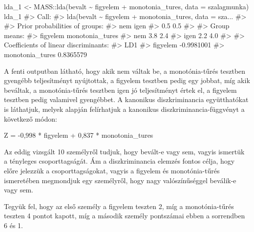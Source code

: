 \documentclass[
  letterpaper,
]{krantz}
\makeatletter
\newenvironment{Shaded}{\begin{snugshade}}{\end{snugshade}}
\newcommand{\AttributeTok}[1]{\textcolor[rgb]{0.40,0.45,0.13}{#1}}
\newcommand{\CommentTok}[1]{\textcolor[rgb]{0.37,0.37,0.37}{#1}}
\newcommand{\FunctionTok}[1]{\textcolor[rgb]{0.28,0.35,0.67}{#1}}
\newcommand{\NormalTok}[1]{\textcolor[rgb]{0.00,0.23,0.31}{#1}}
\newcommand{\OtherTok}[1]{\textcolor[rgb]{0.00,0.23,0.31}{#1}}
\newcommand{\SpecialCharTok}[1]{\textcolor[rgb]{0.37,0.37,0.37}{#1}}
\newenvironment{kframe}{%
\medskip{}
\setlength{\fboxsep}{.8em}
 \def\at@end@of@kframe{}%
 \ifinner\ifhmode%
  \def\at@end@of@kframe{\end{minipage}}%
  \begin{minipage}{\columnwidth}%
 \fi\fi%
 \def\FrameCommand##1{\hskip\@totalleftmargin \hskip-\fboxsep
 \colorbox{shadecolor}{##1}\hskip-\fboxsep
     \hskip-\linewidth \hskip-\@totalleftmargin \hskip\columnwidth}%
 \MakeFramed {\advance\hsize-\width
   \@totalleftmargin\z@ \linewidth\hsize
   \@setminipage}}%
 {\par\unskip\endMakeFramed%
 \at@end@of@kframe}
\renewenvironment{Shaded}{\begin{kframe}}{\end{kframe}}
\makeatother
\begin{document}
\begin{Shaded}
\begin{Highlighting}[]
\NormalTok{lda\_1 }\OtherTok{\textless{}{-}}\NormalTok{ MASS}\SpecialCharTok{::}\FunctionTok{lda}\NormalTok{(bevalt }\SpecialCharTok{\textasciitilde{}}\NormalTok{ figyelem }\SpecialCharTok{+}\NormalTok{ monotonia\_tures, }\AttributeTok{data =}\NormalTok{ szalagmunka)}
\NormalTok{lda\_1}
\CommentTok{\#\textgreater{} Call:}
\CommentTok{\#\textgreater{} lda(bevalt \textasciitilde{} figyelem + monotonia\_tures, data = sza...}
\CommentTok{\#\textgreater{} }
\CommentTok{\#\textgreater{} Prior probabilities of groups:}
\CommentTok{\#\textgreater{}  nem igen }
\CommentTok{\#\textgreater{}  0.5  0.5 }
\CommentTok{\#\textgreater{} }
\CommentTok{\#\textgreater{} Group means:}
\CommentTok{\#\textgreater{}      figyelem monotonia\_tures}
\CommentTok{\#\textgreater{} nem       3.8             2.4}
\CommentTok{\#\textgreater{} igen      2.2             4.0}
\CommentTok{\#\textgreater{} }
\CommentTok{\#\textgreater{} Coefficients of linear discriminants:}
\CommentTok{\#\textgreater{}                        LD1}
\CommentTok{\#\textgreater{} figyelem        {-}0.9981001}
\CommentTok{\#\textgreater{} monotonia\_tures  0.8365579}
\end{Highlighting}
\end{Shaded}

A fenti outputban látható, hogy akik nem váltak be, a monotónia-tűrés
tesztben gyengébb teljesítményt nyújtottak, a figyelem tesztben pedig
egy jobbat, míg akik beváltak, a monotónia-tűrés tesztben igen jó
teljesítményt értek el, a figyelem tesztben pedig valamivel gyengébbet.
A kanonikus diszkriminancia együtthatókat is láthatjuk, melyek alapján
felírhatjuk a kanonikus diszkriminancia-függvényt a következő módon:

\begin{Shaded}
\begin{Highlighting}[]
\NormalTok{Z = {-}0,998 * figyelem + 0,837 * monotonia\_tures}
\end{Highlighting}
\end{Shaded}

Az eddig vizsgált 10 személyről tudjuk, hogy bevált-e vagy sem, vagyis
ismertük a tényleges csoporttagságát. Ám a diszkriminancia elemzés
fontos célja, hogy előre jelezzük a csoporttagságokat, vagyis a figyelem
és monotónia-tűrés ismeretében megmondjuk egy személyről, hogy nagy
valószínűséggel beválik-e vagy sem.

Tegyük fel, hogy az első személy a figyelem teszten 2, míg a
monotónia-tűrés teszten 4 pontot kapott, míg a második személy
pontszámai ebben a sorrendben 6 és 1.
\end{document}
